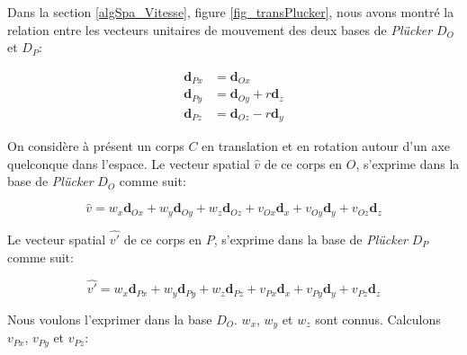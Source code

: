 Dans la section \ref{algSpa_Vitesse}, figure \ref{fig_transPlucker}, nous avons montré la relation entre les vecteurs unitaires de mouvement des deux bases de \emph{Plücker} $D_{O}$ et $D_{P}$:

\begin{align*}
  \textbf{d}_{Px} &= \textbf{d}_{Ox} \\
  \textbf{d}_{Py} &= \textbf{d}_{Oy}+r \textbf{d}_{z} \\
  \textbf{d}_{Pz} &= \textbf{d}_{Oz}-r \textbf{d}_{y}
\end{align*}

On considère à présent un corps $C$ en translation et en rotation autour d'un axe quelconque dans l'espace. Le vecteur spatial $\widehat{v}$ de ce corps en $O$, s'exprime dans la base de \emph{Plücker} $D_{O}$ comme suit:

\begin{equation*}
  \widehat{v} = w_{x}\textbf{d}_{Ox} + w_{y}\textbf{d}_{Oy} + w_{z}\textbf{d}_{Oz} + v_{Ox}\textbf{d}_{x} + v_{Oy}\textbf{d}_{y} + v_{Oz}\textbf{d}_{z}
\end{equation*}

Le vecteur spatial $\widehat{v'}$ de ce corps en $P$, s'exprime dans la base de \emph{Plücker} $D_{P}$ comme suit:

\begin{equation*}
  \widehat{v'} = w_{x}\textbf{d}_{Px} + w_{y}\textbf{d}_{Py} + w_{z}\textbf{d}_{Pz} + v_{Px}\textbf{d}_{x} + v_{Py}\textbf{d}_{y} + v_{Pz}\textbf{d}_{z}
\end{equation*}

Nous voulons l'exprimer dans la base $D_{O}$. $w_{x}$, $w_{y}$ et $w_{z}$ sont connus. Calculons $v_{Px}$, $v_{Py}$ et $v_{Pz}$:

